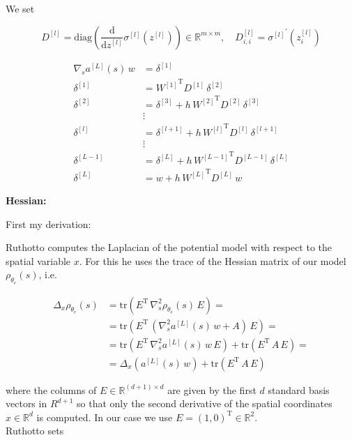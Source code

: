 We set

\begin{equation*}
    D^{[l]} = \mathrm{diag} \left( \frac{\mathrm{d}}{\mathrm{d}z^{[l]}} \sigma^{[l]} (z^{[l]}) \right) \in \mathbb{R}^{m \times m}, \quad D_{i, i}^{[l]} = {\sigma^{[l]}}^{\prime} (z_{i}^{[l]})
\end{equation*}

\begin{align*}
    \nabla_s a^{[L]}(s) \, w & = \delta^{[1]}  \\
    \delta^{[1]} & = {W^{[1]}}^{\mathrm{T}} D^{[1]} \, \delta^{[2]} \\
    \delta^{[2]} & = \delta^{[3]} + h \, {W^{[2]}}^{\mathrm{T}} D^{[2]} \, \delta^{[3]} \\
    &\vdots\\
    \delta^{[l]} & = \delta^{[l+1]} + h \, {W^{[l]}}^{\mathrm{T}} D^{[l]} \, \delta^{[l+1]} \\
    &\vdots\\
    \delta^{[L-1]} & = \delta^{[L]} + h \, {W^{[L-1]}}^{\mathrm{T}} D^{[L-1]} \, \delta^{[L]} \\
    \delta^{[L]} & = w + h \, {W^{[L]}}^{\mathrm{T}} D^{[L]} \, w
\end{align*}


\textbf{Hessian:}

First my derivation:

Ruthotto computes the Laplacian of the potential model with respect to the spatial variable $x$. For this he uses the trace of the Hessian matrix of our model $\rho_{\theta_e}(s)$, i.e. 

\begin{align*}
    \Delta_x \rho_{\theta_e}(s) & = \mathrm{tr}(E^{\mathrm{T}} \, \nabla^{2}_s \rho_{\theta_e}(s) \, E) = \\
    & = \mathrm{tr}(E^{\mathrm{T}} \, (\nabla^{2}_s a^{[L]}(s) \, w + A) \, E) = \\
    & = \mathrm{tr}(E^{\mathrm{T}} \, \nabla^{2}_s a^{[L]}(s) \, w \, E) + \mathrm{tr}(E^{\mathrm{T}} \,  A \, E) = \\
    & = \Delta_x (a^{[L]}(s) \, w) + \mathrm{tr}(E^{\mathrm{T}} \,  A \, E)
\end{align*}

where the columns of $E \in \mathbb{R}^{(d+1) \times d}$ are given by the first $d$ standard basis vectors in $R^{d+1}$ so that only the second derivative of the spatial coordinates $x \in \mathbb{R}^d$ is computed. In our case we use $E = (1, 0)^{\mathrm{T}} \in \mathbb{R}^{2}$. \\
Ruthotto sets

